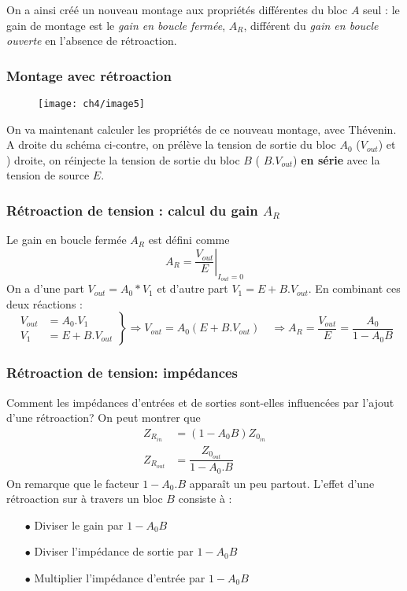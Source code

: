 		On a ainsi créé un nouveau montage aux propriétés différentes 
		du bloc $A$ seul : le gain de montage est le \textit{gain en 
		boucle fermée}, $A_R$, différent du \textit{gain en boucle 
		ouverte} en l'absence de rétroaction.
		
		\subsubsection{Montage avec rétroaction}
		\begin{wrapfigure}[4]{r}{5cm}
		\vspace{-7mm}
		\texttt{[image: ch4/image5]}
		\end{wrapfigure}
		On va maintenant calculer les propriétés de ce nouveau 
		montage, avec Thévenin. A droite du schéma ci-contre, on 
		prélève la tension de sortie du bloc $A_0$ ($V_{out}$) et ) 
		droite, on réinjecte la tension de sortie du bloc $B$ (
		$B.V_{out}$) \textbf{en série} avec la tension de source $E$.
		
		\subsubsection{Rétroaction de tension : calcul du gain $A_R$}
		Le gain en boucle fermée $A_R$ est défini comme
		\begin{equation}
		A_R = \left.\dfrac{V_{out}}{E}\right|_{I_{out}=0} 
		\end{equation}
		On a d'une part $V_{out} = A_0*V_1$ et d'autre part $V_1 = 
		E+B.V_{out}$. En combinant ces deux réactions : 
		\begin{equation}
		\left. \begin{array}{ll}
		V_{out} &= A_0.V_1\\
		V_1 &= E+B.V_{out}
		\end{array}\right\}\Rightarrow V_{out} = A_0(E+B.V_{out})\quad 
		\Longrightarrow A_R = \dfrac{V_{out}}{E}=\dfrac{A_0}{1-A_0B}
		\end{equation}
		
		\subsubsection{Rétroaction de tension: impédances}
		Comment les impédances d'entrées et de sorties sont-elles 
		influencées par l'ajout d'une rétroaction? On peut montrer que 
		\begin{equation}
		\begin{array}{ll}
		Z_{R_{in}} &= (1-A_0B)Z_{0_{in}}\\
		Z_{R_{out}} &= \dfrac{Z_{0_{out}}}{1-A_0.B}
		\end{array}
		\end{equation}
		On remarque que le facteur $1-A_0.B$ apparaît un peu partout. 
		L'effet d'une rétroaction sur à travers un bloc $B$ consiste à :
		\begin{itemize}
		\item[$\bullet$] Diviser le gain par $1-A_0B$
		\item[$\bullet$] Diviser l'impédance de sortie par $1-A_0B$
		\item[$\bullet$] Multiplier l'impédance d'entrée par $1-A_0B$
		\end{itemize}
		
